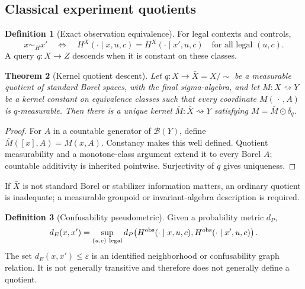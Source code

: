 \documentclass[11pt,a4paper]{article}
\theoremstyle{definition}
\newtheorem{definition}{Definition}[section]
\theoremstyle{plain}
\newtheorem{theorem}[definition]{Theorem}
\theoremstyle{remark}
\begin{document}
\subsection{Classical experiment quotients}

\begin{definition}[Exact observation equivalence]\label{def:obseq}
For legal contexts and controls,
\[
x\sim_Hx'
\quad\Longleftrightarrow\quad
H^{X}(\cdot\mid x,u,c)
=H^{X}(\cdot\mid x',u,c)
\quad\text{for all legal }(u,c).
\]
A query \(q:X\to Z\) descends when it is constant on these classes.
\end{definition}

\begin{theorem}[Kernel quotient descent]\label{thm:quotient}
Let \(q:X\to\bar X=X/{\sim}\) be a measurable quotient of standard Borel
spaces, with the final sigma-algebra, and let \(M:X\rightsquigarrow Y\) be a
kernel constant on equivalence classes such that every coordinate
\(M(\,\cdot\,,A)\) is \(q\)-measurable.
Then there is a unique kernel \(\bar M:\bar X\rightsquigarrow Y\) satisfying
\(M=\bar M\odot\delta_q\).
\end{theorem}
\begin{proof}
For \(A\) in a countable generator of \(\mathcal B(Y)\), define
\(\bar M([x],A)=M(x,A)\).  Constancy makes this well defined.  Quotient
measurability and a monotone-class argument extend it to every Borel \(A\);
countable additivity is inherited pointwise.  Surjectivity of \(q\) gives
uniqueness.
\end{proof}

If \(\bar X\) is not standard Borel or stabilizer information matters, an
ordinary quotient is inadequate; a measurable groupoid or invariant-algebra
description is required.

\begin{definition}[Confusability pseudometric]\label{def:confusable}
Given a probability metric \(d_P\),
\[
d_E(x,x')=\sup_{(u,c)\ {\rm legal}}
d_P\!\left(H^{\rm obs}(\cdot\mid x,u,c),
H^{\rm obs}(\cdot\mid x',u,c)\right).
\]
The set \(d_E(x,x')\le\varepsilon\) is an identified neighborhood or
confusability graph relation.  It is not generally transitive and therefore
does not generally define a quotient.
\end{definition}
\end{document}
